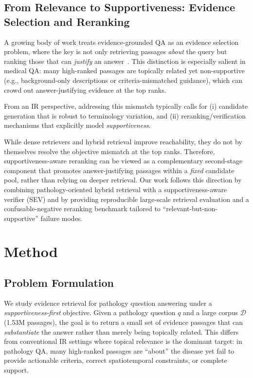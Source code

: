 \documentclass[preprint,12pt,a4paper]{elsarticle}
\begin{document}
\subsection{From Relevance to Supportiveness: Evidence Selection and Reranking}
A growing body of work treats evidence-grounded QA as an evidence selection problem, where the key is not only retrieving passages \emph{about} the query but ranking those that can \emph{justify} an answer~\cite{gao2023ragsurvey,thorne2018fever}.
This distinction is especially salient in medical QA: many high-ranked passages are topically related yet non-supportive (e.g., background-only descriptions or criteria-mismatched guidance), which can crowd out answer-justifying evidence at the top ranks.


From an IR perspective, addressing this mismatch typically calls for (i) candidate generation that is robust to terminology variation, and (ii) reranking/verification mechanisms that explicitly model \emph{supportiveness}.

While dense retrievers and hybrid retrieval improve reachability, they do not by themselves resolve the objective mismatch at the top ranks.
Therefore, supportiveness-aware reranking can be viewed as a complementary second-stage component that promotes answer-justifying passages within a \emph{fixed} candidate pool, rather than relying on deeper retrieval.
Our work follows this direction by combining pathology-oriented hybrid retrieval with a supportiveness-aware verifier (SEV) and by providing reproducible large-scale retrieval evaluation and a confusable-negative reranking benchmark tailored to ``relevant-but-non-supportive'' failure modes.

\section{Method}
\label{sec:method}

\subsection{Problem Formulation}
\label{sec:method:formulation}
We study evidence retrieval for pathology question answering under a \emph{supportiveness-first} objective.
Given a pathology question $q$ and a large corpus $\mathcal{D}$ (1.53M passages), the goal is to return a small set of evidence passages that can \emph{substantiate} the answer rather than merely being topically related.
This differs from conventional IR settings where topical relevance is the dominant target: in pathology QA, many high-ranked passages are ``about'' the disease yet fail to provide actionable criteria, correct spatiotemporal constraints, or complete support.
\end{document}
